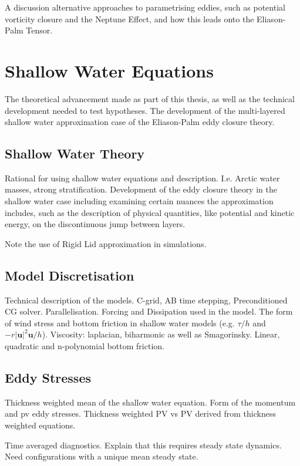 \documentclass[10pt,a4paper]{article}
\begin{document}
A discussion alternative approaches to parametrising eddies,
such as potential vorticity closure  and 
the Neptune Effect, and how this
leads onto the Eliason-Palm Tensor.

\section{Shallow Water Equations}

The theoretical advancement made as part of this thesis, as well as the technical development 
needed to test hypotheses. The development of the 
multi-layered  shallow water approximation case of the 
Eliason-Palm eddy closure theory.

\subsection{Shallow Water Theory}

Rational for using shallow water equations and
description. I.e. Arctic water masses, 
strong stratification. Development of the eddy closure theory in the shallow water case
including examining certain nuances the approximation includes, such
as the description of physical quantities, like
potential and kinetic energy, on the discontinuous 
jump between layers.

Note the use of Rigid Lid approximation in
simulations.

\subsection{Model Discretisation}

Technical description of the models. 
C-grid, AB time stepping, Preconditioned CG solver. 
Parallelisation.
Forcing and Dissipation used in the model.
The form of wind stress and bottom friction in
shallow water models (e.g. $\tau/h$ and 
$-r\left|\boldsymbol{u}\right|^{2}\boldsymbol{u}/h$). Viscosity:
laplacian, biharmonic as well as Smagorinsky.
Linear, quadratic and n-polynomial bottom friction.

\subsection{Eddy Stresses}

Thickness weighted mean of the shallow water
equation. Form of the momentum and pv eddy stresses.
Thickness weighted PV vs PV derived from thickness 
weighted equations.

Time averaged diagnostics. Explain that this 
requires steady state dynamics. Need configurations
with a unique mean steady state.
\end{document}
